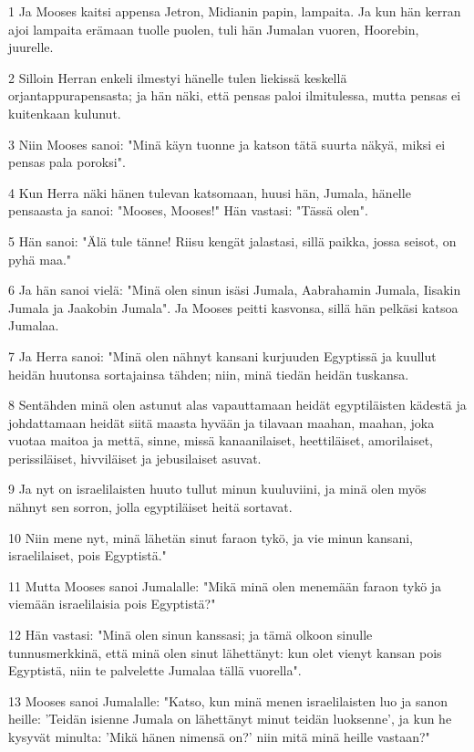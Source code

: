 \par 1 Ja Mooses kaitsi appensa Jetron, Midianin papin, lampaita. Ja kun hän kerran ajoi lampaita erämaan tuolle puolen, tuli hän Jumalan vuoren, Hoorebin, juurelle.
\par 2 Silloin Herran enkeli ilmestyi hänelle tulen liekissä keskellä orjantappurapensasta; ja hän näki, että pensas paloi ilmitulessa, mutta pensas ei kuitenkaan kulunut.
\par 3 Niin Mooses sanoi: "Minä käyn tuonne ja katson tätä suurta näkyä, miksi ei pensas pala poroksi".
\par 4 Kun Herra näki hänen tulevan katsomaan, huusi hän, Jumala, hänelle pensaasta ja sanoi: "Mooses, Mooses!" Hän vastasi: "Tässä olen".
\par 5 Hän sanoi: "Älä tule tänne! Riisu kengät jalastasi, sillä paikka, jossa seisot, on pyhä maa."
\par 6 Ja hän sanoi vielä: "Minä olen sinun isäsi Jumala, Aabrahamin Jumala, Iisakin Jumala ja Jaakobin Jumala". Ja Mooses peitti kasvonsa, sillä hän pelkäsi katsoa Jumalaa.
\par 7 Ja Herra sanoi: "Minä olen nähnyt kansani kurjuuden Egyptissä ja kuullut heidän huutonsa sortajainsa tähden; niin, minä tiedän heidän tuskansa.
\par 8 Sentähden minä olen astunut alas vapauttamaan heidät egyptiläisten kädestä ja johdattamaan heidät siitä maasta hyvään ja tilavaan maahan, maahan, joka vuotaa maitoa ja mettä, sinne, missä kanaanilaiset, heettiläiset, amorilaiset, perissiläiset, hivviläiset ja jebusilaiset asuvat.
\par 9 Ja nyt on israelilaisten huuto tullut minun kuuluviini, ja minä olen myös nähnyt sen sorron, jolla egyptiläiset heitä sortavat.
\par 10 Niin mene nyt, minä lähetän sinut faraon tykö, ja vie minun kansani, israelilaiset, pois Egyptistä."
\par 11 Mutta Mooses sanoi Jumalalle: "Mikä minä olen menemään faraon tykö ja viemään israelilaisia pois Egyptistä?"
\par 12 Hän vastasi: "Minä olen sinun kanssasi; ja tämä olkoon sinulle tunnusmerkkinä, että minä olen sinut lähettänyt: kun olet vienyt kansan pois Egyptistä, niin te palvelette Jumalaa tällä vuorella".
\par 13 Mooses sanoi Jumalalle: "Katso, kun minä menen israelilaisten luo ja sanon heille: 'Teidän isienne Jumala on lähettänyt minut teidän luoksenne', ja kun he kysyvät minulta: 'Mikä hänen nimensä on?' niin mitä minä heille vastaan?"
